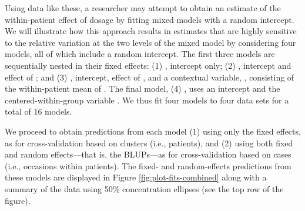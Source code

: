 \documentclass[
]{jss}
\begin{document}
Using data like these, a researcher may attempt to obtain an estimate of
the within-patient effect of dosage by fitting mixed models with a
random intercept. We will illustrate how this approach results in
estimates that are highly sensitive to the relative variation at the two
levels of the mixed model by considering four models, all of which
include a random intercept. The first three models are sequentially
nested in their fixed effects: (1) , intercept only; (2)
, intercept and effect of ; and (3)
, intercept, effect of , and a contextual
variable, , consisting of the within-patient mean of .
The final model, (4) , uses an intercept and the
centered-within-group variable . We thus fit four models to
four data sets for a total of 16 models.

We proceed to obtain predictions from each model (1) using only the
fixed effects, as for cross-validation based on clusters (i.e.,
patients), and (2) using both fixed and random effects---that is, the
BLUPs---as for cross-validation based on cases (i.e., occasions within
patients). The fixed- and random-effects predictions from these models
are displayed in Figure \ref{fig:plot-fits-combined} along with a
summary of the data using 50\% concentration ellipses (see the top row
of the figure).
\end{document}
